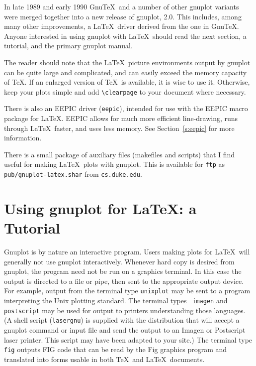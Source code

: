 In late 1989 and early 1990 Gnu\TeX\ and a number of other gnuplot
variants were merged together into a new release of gnuplot, 2.0. This
includes, among many other improvements, a \LaTeX\ driver derived from
the one in Gnu\TeX.
Anyone interested in using gnuplot with \LaTeX\ should read the next
section, a tutorial, and the primary gnuplot manual.

The reader should note that the \LaTeX\ picture environments output by
gnuplot can be quite large and complicated, and can easily exceed the
memory capacity of \TeX. If an enlarged version of \TeX\ is available,
it is wise to use it. Otherwise, keep your plots simple and add
\verb+\clearpage+ to your document where necessary.

There is also an EEPIC driver ({\tt eepic}), intended for use with
the EEPIC macro package for \LaTeX. EEPIC allows for much more
efficient line-drawing, runs through \LaTeX\ faster, and uses less
memory.  See Section~\ref{s:eepic} for more information.

There is a small package of auxiliary files (makefiles and scripts)
that I find useful for making \LaTeX\ plots with gnuplot. This is
available for \verb+ftp+ as \verb+pub/gnuplot-latex.shar+ from
\verb+cs.duke.edu+.

\section{Using gnuplot for \LaTeX: a Tutorial}

Gnuplot is by nature an interactive program. Users making plots for
\LaTeX\ will generally not use gnuplot interactively.  Whenever hard
copy is desired from gnuplot, the program need not be run on a
graphics terminal. In this case the output is directed to a file or
pipe, then sent to the appropriate output device. For example, output
from the terminal type {\tt unixplot} may be sent to a program
interpreting the Unix plotting standard. The terminal types {\tt
imagen} and {\tt postscript} may be used for output to printers
understanding those languages. (A shell script ({\tt lasergnu}) is
supplied with the distribution that will accept a gnuplot command or
input file and send the output to an Imagen or Postscript laser
printer. This script may have been adapted to your site.) The terminal
type {\tt fig} outputs FIG code that can be read by the Fig graphics
program and translated into forms usable in both \TeX\ and
\LaTeX\ documents.

